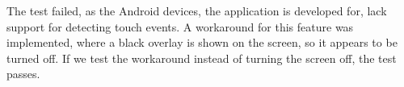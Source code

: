 The test failed, as the Android devices, the application is developed for, lack support for detecting touch events. A workaround for this feature was implemented, where a black overlay is shown on the screen, so it appears to be turned off. If we test the workaround instead of turning the screen off, the test passes.